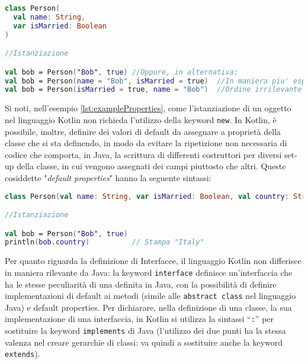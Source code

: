 \begin{lstlisting}[caption={Utilizzo delle proprietà di una classe Kotlin}, captionpos=b, label={lst:exampleProperties}, language=Kotlin]
class Person(
  val name: String,
  var isMarried: Boolean
)

//Istanziazione

val bob = Person("Bob", true) //Oppure, in alternativa:
val bob = Person(name = "Bob", isMarried = true)  //In maniera piu' espressiva
val bob = Person(isMarried = true, name = "Bob")  //Ordine irrilevante con questa sintassi
\end{lstlisting}

Si noti, nell'esempio \ref{lst:exampleProperties}, come l'istanziazione di un oggetto nel linguaggio Kotlin non richieda l'utilizzo della keyword \texttt{new}. In Kotlin, è possibile, inoltre, definire dei valori di default da assegnare a proprietà della classe che si sta definendo, in modo da evitare la ripetizione non necessaria di codice che comporta, in Java, la scrittura di differenti costruttori per diversi set-up della classe, in cui vengono assegnati dei campi piuttosto che altri. Queste cosiddette "{\em default properties}" hanno la seguente sintassi:\\

\begin{lstlisting}[caption={Proprietà predefinite}, captionpos=b, label={lst:exampleDefProperties}, language=Kotlin]
class Person(val name: String, var isMarried: Boolean, val country: String = "Italy")

//Istanziazione

val bob = Person("Bob", true)
println(bob.country)          // Stampa "Italy"
\end{lstlisting}

Per quanto riguarda la definizione di Interfacce, il linguaggio Kotlin non differisce in maniera rilevante da Java: la keyword \texttt{interface} definisce un’interfaccia che ha le stesse peculiarità di una definita in Java, con la possibilità di definire implementazioni di default ai metodi (simile alle \texttt{abstract class} nel linguaggio Java) e default properties. Per dichiarare, nella definizione di una classe, la sua implementazione di una interfaccia, in Kotlin si utilizza la sintassi “\texttt{:}” per sostituire la keyword \texttt{implements} di Java (l'utilizzo dei due punti ha la stessa valenza nel creare gerarchie di classi: va quindi a sostituire anche la keyword \texttt{extends}).\\

